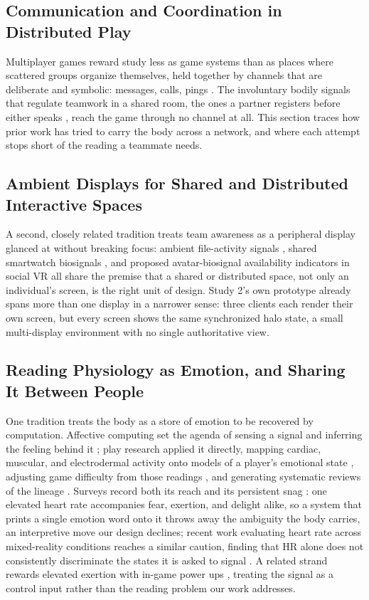 \documentclass[manuscript,review,anonymous]{acmart}
\begin{document}
\subsection{Communication and Coordination in Distributed Play}
Multiplayer games reward study less as game systems than as places where scattered groups organize themselves, held together by channels that are deliberate and symbolic: messages, calls, pings \cite{bisberg_communication_2025, leavitt_ping_2016}. The involuntary bodily signals that regulate teamwork in a shared room, the ones a partner registers before either speaks \cite{suchman_plans_1987, dourish_where_2004}, reach the game through no channel at all. This section traces how prior work has tried to carry the body across a network, and where each attempt stops short of the reading a teammate needs.

\subsection{Ambient Displays for Shared and Distributed Interactive Spaces}
A second, closely related tradition treats team awareness as a peripheral display glanced at without breaking focus: ambient file-activity signals \cite{morrisonsmith_ambiteam_2021}, shared smartwatch biosignals \cite{liu_animo_2019}, and proposed avatar-biosignal availability indicators in social VR \cite{elali_social_2023} all share the premise that a shared or distributed space, not only an individual's screen, is the right unit of design. Study 2's own prototype already spans more than one display in a narrower sense: three clients each render their own screen, but every screen shows the same synchronized halo state, a small multi-display environment with no single authoritative view.

\subsection{Reading Physiology as Emotion, and Sharing It Between People}
One tradition treats the body as a store of emotion to be recovered by computation. Affective computing set the agenda of sensing a signal and inferring the feeling behind it \cite{picard_affective_1997}; play research applied it directly, mapping cardiac, muscular, and electrodermal activity onto models of a player's emotional state \cite{mandryk_fuzzy_2007, ravaja_phasic_2006}, adjusting game difficulty from those readings \cite{nacke_biofeedback_2011}, and generating systematic reviews of the lineage \cite{navarro_biofeedback_2021}. Surveys record both its reach and its persistent snag \cite{gan_human-computer_2022, robinson_lets_2020}: one elevated heart rate accompanies fear, exertion, and delight alike, so a system that prints a single emotion word onto it throws away the ambiguity the body carries, an interpretive move our design declines; recent work evaluating heart rate across mixed-reality conditions reaches a similar caution, finding that HR alone does not consistently discriminate the states it is asked to signal \cite{chiossi_typing_2024}. A related strand rewards elevated exertion with in-game power ups \cite{ketcheson_designing_2015}, treating the signal as a control input rather than the reading problem our work addresses.
\end{document}
